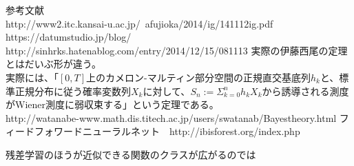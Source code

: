 \documentclass{jsarticle}
\begin{document}
\newpage
参考文献\\
http://www2.itc.kansai-u.ac.jp/~afujioka/2014/ig/141112ig.pdf
https://datumstudio.jp/blog/\\
http://sinhrks.hatenablog.com/entry/2014/12/15/081113
実際の伊藤西尾の定理とはだいぶ形が違う。\\
実際には、「$[0,T]$上のカメロン-マルティン部分空間の正規直交基底列$h_k$と、標準正規分布に従う確率変数列$X_k$に対して、$S_n:=\Sigma^n_{k=0}h_kX_k$から誘導される測度がWiener測度に弱収束する」という定理である。
　\\http://watanabe-www.math.dis.titech.ac.jp/users/swatanab/Bayestheory.html
フィードフォワードニューラルネット　http://ibisforest.org/index.php%

残差学習のほうが近似できる関数のクラスが広がるのでは
\end{document}
